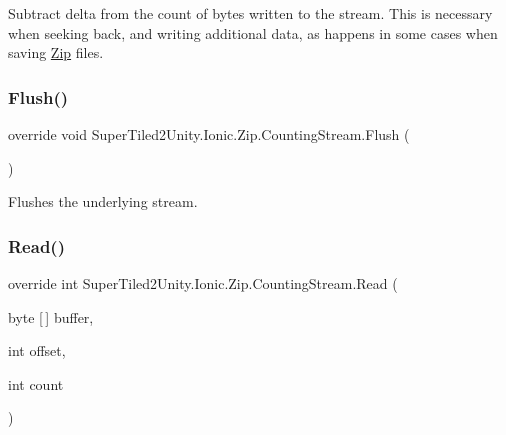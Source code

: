 Subtract delta from the count of bytes written to the stream. This is necessary when seeking back, and writing additional data, as happens in some cases when saving \mbox{\hyperlink{namespace_super_tiled2_unity_1_1_ionic_1_1_zip}{Zip}} files. \mbox{\label{class_super_tiled2_unity_1_1_ionic_1_1_zip_1_1_counting_stream_a08a709573aafe7a7154dc72e68b11a65}} 
\subsubsection{\texorpdfstring{Flush()}{Flush()}}
{\footnotesize\ttfamily override void Super\+Tiled2\+Unity.\+Ionic.\+Zip.\+Counting\+Stream.\+Flush (\begin{DoxyParamCaption}{ }\end{DoxyParamCaption})}



Flushes the underlying stream. 

\mbox{\label{class_super_tiled2_unity_1_1_ionic_1_1_zip_1_1_counting_stream_a54ad33f7f179c692c3b4dafc3f60ae06}} 
\subsubsection{\texorpdfstring{Read()}{Read()}}
{\footnotesize\ttfamily override int Super\+Tiled2\+Unity.\+Ionic.\+Zip.\+Counting\+Stream.\+Read (\begin{DoxyParamCaption}\item[{byte \mbox{[}$\,$\mbox{]}}]{buffer,  }\item[{int}]{offset,  }\item[{int}]{count }\end{DoxyParamCaption})}



